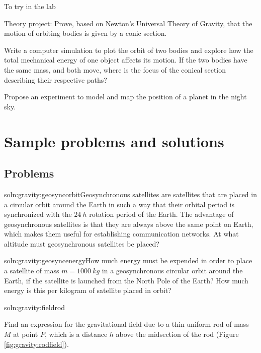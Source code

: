 \begin{chapteractivity}{To try in the lab}
{
\item Theory project: Prove, based on Newton's Universal Theory of Gravity, that the motion of orbiting bodies is given by a conic section. 
\item Write a computer simulation to plot the orbit of two bodies and explore how the total mechanical energy of one object affects its motion. If the two bodies have the same mass, and both move, where is the focus of the conical section describing their respective paths?
\item Propose an experiment to model and map the position of a planet in the night sky.
}
\end{chapteractivity}
\newpage
\section{Sample problems and solutions}
\subsection{Problems}
\begin{problem}{soln:gravity:geosyncorbit}{\label{prob:gravity:geosyncorbit}Geosynchronous satellites are satellites that are placed in a circular orbit around the Earth in such a way that their orbital period is synchronized with the $\SI{24}{h}$ rotation period of the Earth. The advantage of geosynchronous satellites is that they are always above the same point on Earth, which makes them useful for establishing communication networks. At what altitude must geosynchronous satellites be placed?}
\end{problem}

\begin{problem}{soln:gravity:geosyncenergy}{\label{prob:gravity:geosyncenergy}How much energy must be expended in order to place a satellite of mass $m=\SI{1000}{kg}$ in a geosynchronous circular orbit around the Earth, if the satellite is launched from the North Pole of the Earth? How much energy is this per kilogram of satellite placed in orbit?}
\end{problem}

\begin{problem}{soln:gravity:fieldrod}{\label{prob:gravity:fieldrod}Find an expression for the gravitational field due to a thin uniform rod of mass $M$ at point $P$, which is a distance $h$ above the midsection of the rod (Figure \ref{fig:gravity:rodfield}).

}
\end{problem}

